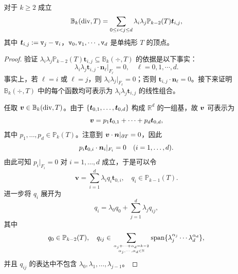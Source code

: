\begin{lemma}
对于 $k\geq2$ 成立
\begin{equation}\label{eq:Hdivbubbleidentity}
\mathbb B_k(\operatorname{div}, T)=\sum_{0\leq i<j\leq d}\lambda_i\lambda_j\mathbb P_{k-2}(T)\boldsymbol t_{i,j},
\end{equation}
其中 $\boldsymbol t_{i,j}:=\textnormal{\texttt{v}}_j-\textnormal{\texttt{v}}_i$，$\textnormal{\texttt{v}}_0, \textnormal{\texttt{v}}_1, \cdots, \textnormal{\texttt{v}}_d$ 是单纯形 $T$ 的顶点。
\end{lemma}
\begin{proof}
验证 $\lambda_i\lambda_j\mathbb P_{k-2}(T)\boldsymbol t_{i,j}\subseteq \mathbb B_k(\div, T)$ 的依据是以下事实：
$$\lambda_i\lambda_j \boldsymbol t_{i,j}\cdot \boldsymbol n_{\ell}|_{F_{\ell}} = 0, \quad \ell = 0, 1, \cdots, d.$$
事实上，若 $\ell = i$ 或 $\ell = j$，则 $\lambda_i\lambda_j|_{F_{\ell}} =0$；否则 $\boldsymbol t_{i,j}\cdot \boldsymbol n_{\ell} = 0$。接下来证明 $\mathbb B_k(\div, T)$ 中的每个函数均可表示为 $\lambda_i\lambda_j \boldsymbol t_{i,j}$ 的线性组合。


任取 $\boldsymbol v\in\mathbb B_k(\operatorname{div}, T)$。由于 $\{\boldsymbol t_{0,1}, \ldots, \boldsymbol t_{0,d}\}$ 构成 $\mathbb R^d$ 的一组基，故 $\boldsymbol v$ 可表示为
$$\boldsymbol v=p_1\boldsymbol t_{0,1}+\cdots+p_d\boldsymbol t_{0,d},$$ 
其中 $p_1, \ldots, p_d\in\mathbb P_k(T)$。注意到 $\boldsymbol v\cdot\boldsymbol n|_{\partial T}=0$，因此
\[
p_i\boldsymbol t_{0,i}\cdot\boldsymbol n_i|_{F_i}=0 \quad (i=1,\ldots,d).
\]
由此可知 $p_i|_{F_i} = 0$  对 $i=1,\dots,d$ 成立，于是可以令
\[
\boldsymbol v = \sum_{i=1}^{d} \lambda_i q_i \boldsymbol t_{0,i}, \quad q_i\in \mathbb P_{k-1}(T).
\]
进一步将 $q_i$ 展开为
\[
q_i = \lambda_0 q_0 + \sum_{j=1}^{d} \lambda_j q_{ij},
\]
其中
\[
q_0 \in \mathbb P_{k-2}(T), \quad q_{ij} \in \sum_{\alpha_j+\cdots+\alpha_{d}=k-2 \atop \alpha_j,\cdots,\alpha_{d}\in\mathbb N} \mathrm{span}\{\lambda_j^{\alpha_j}\cdots \lambda_d^{\alpha_d}\},
\]
并且 $q_{ij}$ 的表达中不包含 $\lambda_0, \lambda_1, \ldots, \lambda_{j-1}$。


\end{proof}
